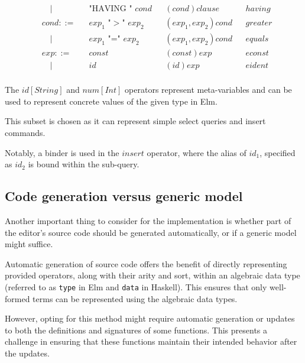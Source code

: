 \documentclass[sigplan,review]{acmart}
\begin{document}
\begin{example}
\[\begin{aligned}
       & \quad |     &  & \text{"HAVING " $cond$}         &   & (cond)clause            &  & having          \\
       & cond ::=    &  & \text{$exp_1$ "$>$" $exp_2$}    &   & (exp_1,exp_2)cond       &  & greater         \\
       & \quad |     &  & \text{$exp_1$ "=" $exp_2$}      &   & (exp_1,exp_2)cond       &  & equals          \\
       & exp ::=     &  & \text{$const$}                  &   & (const)exp              &  & econst          \\
       & \quad |     &  & \text{$id$}                     &   & (id)exp                 &  & eident          \\
    \end{aligned}
  \]


  The $id[String]$ and $num[Int]$ operators represent meta-variables and can be used to represent concrete values of the given type in Elm.

  This subset is chosen as it can represent simple select queries and insert commands.

  Notably, a binder is used in the $insert$ operator, where the alias of $id_1$, specified as $id_2$ is bound within the sub-query.
\end{example}

\subsection{Code generation versus generic model}

Another important thing to consider for the implementation is whether
part of the editor's source code should be generated automatically,
or if a generic model might suffice.

Automatic generation of source code offers the benefit of directly representing
provided operators, along with their arity and sort, within an algebraic data
type (referred to as \texttt{type} in Elm and \texttt{data} in Haskell).
This ensures that only well-formed terms can be represented using the algebraic
data types.

However, opting for this method might require automatic generation or
updates to both the
definitions and signatures of some functions.
This presents a challenge in ensuring that these functions maintain their intended
behavior after the updates.
\end{document}
